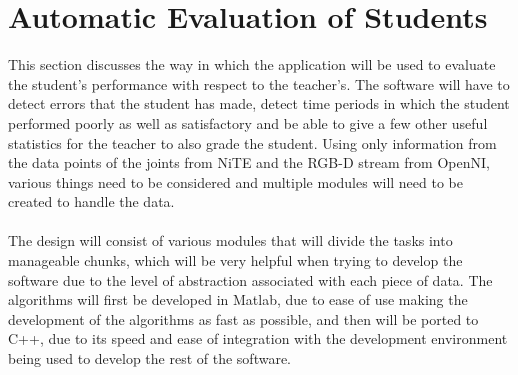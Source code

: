 \documentclass[10pt]{article}
\begin{document}
\section{Automatic Evaluation of Students}
\noindent
This section discusses the way in which the application will be used to evaluate the student's performance with respect to the teacher's. The software will have to detect errors that the student has made, detect time periods in which the student performed poorly as well as satisfactory and be able to give a few other useful statistics for the teacher to also grade the student. Using only information from the data points of the joints from NiTE and the RGB-D stream from OpenNI, various things need to be considered and multiple modules will need to be created to handle the data. 
\\\\
\noindent The design will consist of various modules that will divide the tasks into manageable chunks, which will be very helpful when trying to develop the software due to the level of abstraction associated with each piece of data. The algorithms will first be developed in Matlab, due to ease of use making the development of the algorithms as fast as possible, and then will be ported to C++, due to its speed and ease of integration with the development environment being used to develop the rest of the software. 
\end{document}
